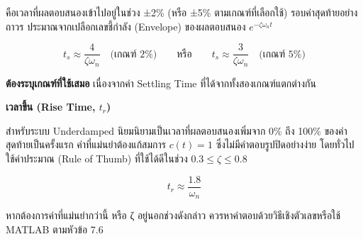 คือเวลาที่ผลตอบสนองเข้าไปอยู่ในช่วง ±2\% (หรือ ±5\% ตามเกณฑ์ที่เลือกใช้) รอบค่าสุดท้ายอย่างถาวร ประมาณจากเปลือกเลขชี้กำลัง (Envelope) ของผลตอบสนอง $e^{-\zeta\omega_n t}$

\[
t_s \approx \frac{4}{\zeta\omega_n} \quad \text{(เกณฑ์ 2\%)} \qquad \text{หรือ} \qquad t_s \approx \frac{3}{\zeta\omega_n} \quad \text{(เกณฑ์ 5\%)}
\]

\textbf{ต้องระบุเกณฑ์ที่ใช้เสมอ} เนื่องจากค่า Settling Time ที่ได้จากทั้งสองเกณฑ์แตกต่างกัน

\textbf{เวลาขึ้น (Rise Time, $t_r$)}

สำหรับระบบ Underdamped นิยมนิยามเป็นเวลาที่ผลตอบสนองเพิ่มจาก 0\% ถึง 100\% ของค่าสุดท้ายเป็นครั้งแรก ค่าที่แม่นยำต้องแก้สมการ $c(t)=1$ ซึ่งไม่มีคำตอบรูปปิดอย่างง่าย โดยทั่วไปใช้ค่าประมาณ (Rule of Thumb) ที่ใช้ได้ดีในช่วง $0.3 \le \zeta \le 0.8$

\[
t_r \approx \frac{1.8}{\omega_n}
\]

หากต้องการค่าที่แม่นยำกว่านี้ หรือ ζ อยู่นอกช่วงดังกล่าว ควรหาคำตอบด้วยวิธีเชิงตัวเลขหรือใช้ MATLAB ตามหัวข้อ 7.6


